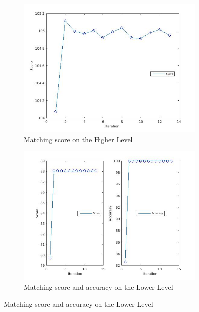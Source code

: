 \documentclass[
	fontsize=12pt,
	paper=a4,
	twoside=false,
	numbers=noenddot,
	plainheadsepline,
	toc=listof,
	toc=bibliography
]{scrartcl}
\begin{document}
\begin{figure}[ht]
	\begin{subfigure}[b]{0.5\textwidth}
		\centering
		\includegraphics[scale=0.25]{fig/method2/test_imagetrafo2/score_HL.jpg} 
		\caption{Matching score on the Higher Level} 
	\end{subfigure}%
	\begin{subfigure}[b]{0.5\textwidth}
		\centering
		\includegraphics[scale=0.25]{fig/method2/test_imagetrafo2/accuracy_LL.jpg} 
		\caption{Matching score and accuracy on the Lower Level} 
	\end{subfigure} 
\end{figure}
\FloatBarrier
\end{document}
